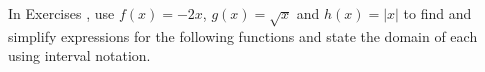 {\noindent In Exercises}
{, use $f(x) = -2x$, $g(x) = \sqrt{x}$ and $h(x) = |x|$ to find and simplify expressions for the following functions and state the domain of each using interval notation. }
